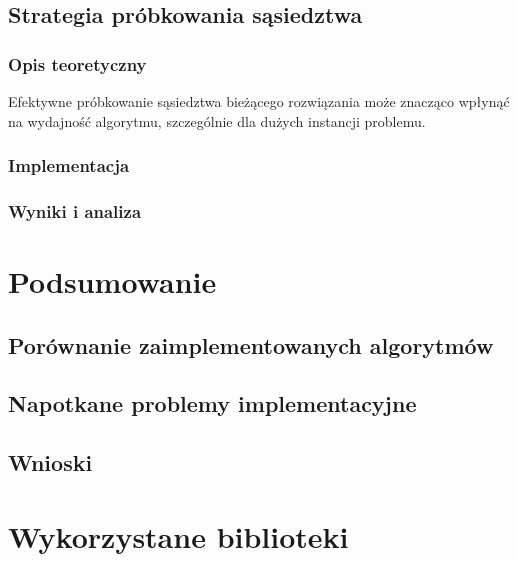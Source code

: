 \documentclass[12pt,a4paper]{article}
\begin{document}
\subsection{Strategia próbkowania sąsiedztwa}
\subsubsection{Opis teoretyczny}
Efektywne próbkowanie sąsiedztwa bieżącego rozwiązania może znacząco wpłynąć na wydajność algorytmu, szczególnie dla dużych instancji problemu.

\subsubsection{Implementacja}

\subsubsection{Wyniki i analiza}

\section{Podsumowanie}
\subsection{Porównanie zaimplementowanych algorytmów}

\subsection{Napotkane problemy implementacyjne}

\subsection{Wnioski}

\section{Wykorzystane biblioteki}
\end{document}
